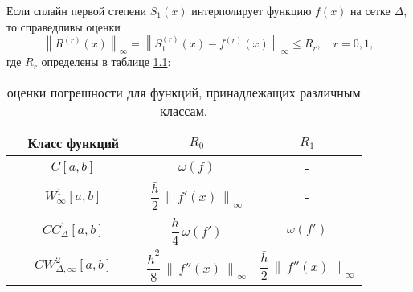 ﻿\documentclass[a4paper,14pt]{extreport}
\begin{document}
    \begin{theorem}
        Если сплайн первой степени $S_{1}(x)$ интерполирует функцию $f(x)$ на сетке $\Delta$, то справедливы оценки
        \begin{equation}
            \label{ch_1.3}
            \left\|R^{(r)}(x)\right\|_{\infty}=\left\|S_{1}^{(r)}(x)-f^{(r)}(x)\right\|_{\infty} \leqslant R_{r}, \quad r=0,1,
        \end{equation}
        где $R_{r}$ определены в таблице \hyperref[table_1]{1.1}:
        \begin{table}[h]
            \label{table_1}
            \renewcommand{\arraystretch}{2.2}
            \centering
            \begin{tabular}[c]{|c|c|c|}
                \hline ~~Класс функций~~ & $R_0$ & $R_1$ \\
                \hline  $C[a,b]$ & $\omega(f)$ & -\\
                $W_{\infty}^{1}[a, b]$ & $\dfrac{\bar{h}}{2}\,\left\|\,f'(x)\,\right\|_{\infty}$& -\\
                $C C_{\Delta}^{1}[a, b]$& $\dfrac{\bar{h}}{4}\,\omega\left(f'\right)$& $\omega\left(f'\right)$\\
                $C W_{\Delta, \infty}^{2}[a, b]$& $\dfrac{\bar{h}^{2}}{8}\,\left\|\,f''(x)\,\right\|_{\infty}$& $\dfrac{\bar{h}}{2}\,\left\|\,f''(x)\,\right\|_{\infty}$\\\hline
            \end{tabular}\vspace{3mm}
            \caption{оценки погрешности для функций, принадлежащих различным классам.}
        \end{table} 
    \end{theorem}
\end{document}

